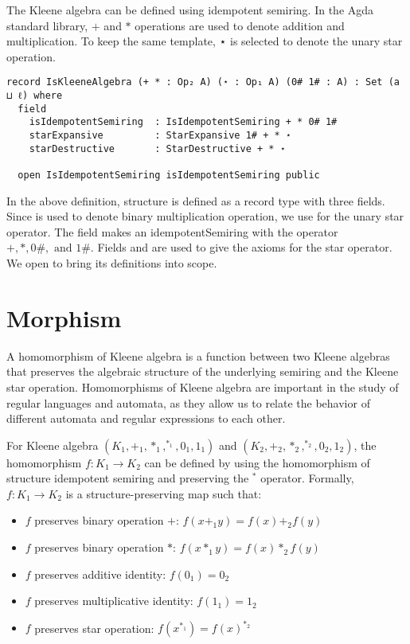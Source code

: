 The Kleene algebra can be defined using idempotent semiring. In the Agda
standard library, $+$ and $*$ operations are used to denote addition and
multiplication. To keep the same template, ⋆ is selected to denote the unary
star operation. 

\begin{verbatim}
record IsKleeneAlgebra (+ * : Op₂ A) (⋆ : Op₁ A) (0# 1# : A) : Set (a ⊔ ℓ) where
  field
    isIdempotentSemiring  : IsIdempotentSemiring + * 0# 1#
    starExpansive         : StarExpansive 1# + * ⋆
    starDestructive       : StarDestructive + * ⋆

  open IsIdempotentSemiring isIdempotentSemiring public
\end{verbatim}
In the above definition,  structure is defined as a
record type with three fields. Since \inline{*} is used to denote binary
multiplication operation, we use  for the unary star operator. The
field  makes an idempotentSemiring with the operator
$+,*,0\#, \text{ and } 1\#$. Fields  and
 are used to give the axioms for the star operator. We
open  to bring its definitions into scope.

\section{Morphism}
A homomorphism of Kleene algebra is a function between two Kleene algebras that
preserves the algebraic structure of the underlying semiring and the Kleene star
operation. Homomorphisms of Kleene algebra are important in the study of regular
languages and automata, as they allow us to relate the behavior of different
automata and regular expressions to each other.

For Kleene algebra $(K_1,+_1,*_1,^{*_1},0_1,1_1)$ and
$(K_2,+_2,*_2,^{*_2},0_2,1_2)$, the homomorphism $f: K_1 \rightarrow K_2$ can be
defined by using the homomorphism of structure idempotent semiring and
preserving the $^{*}$ operator. Formally, $f: K_1 \rightarrow K_2$ is a
structure-preserving map such that:
\begin{itemize}
\item $f$ preserves binary operation $+$: $f(x +_1 y) = f(x) +_2 f(y)$
\item $f$ preserves binary operation $*$: $f(x *_1 y) = f(x) *_2 f(y)$
\item $f$ preserves additive identity: $f(0_1) = 0_2$
\item $f$ preserves multiplicative identity: $f(1_1) = 1_2$
\item $f$ preserves star operation: $f(x^{*_1}) = f(x)^{*_2}$
\end{itemize}

